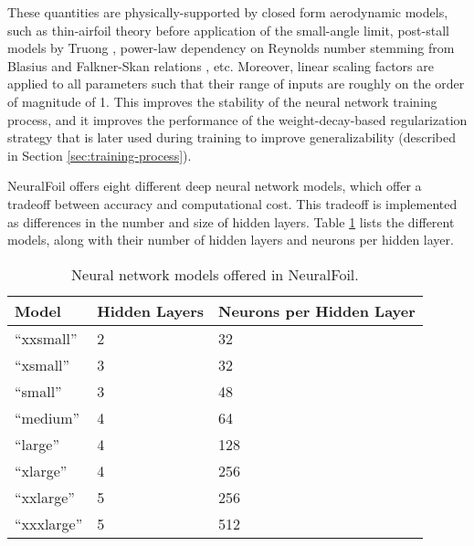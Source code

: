 \documentclass[conf]{new-aiaa}
\begin{document}
    \noindent These quantities are physically-supported by closed form aerodynamic models, such as thin-airfoil theory before application of the small-angle limit, post-stall models by Truong \cite{truong_analytical_2020}, power-law dependency on Reynolds number stemming from Blasius and Falkner-Skan relations \cite{drela_aerodynamics_2019}, etc. Moreover, linear scaling factors are applied to all parameters such that their range of inputs are roughly on the order of magnitude of 1. This improves the stability of the neural network training process, and it improves the performance of the weight-decay-based regularization strategy that is later used during training to improve generalizability (described in Section \ref{sec:training-process}).

    NeuralFoil offers eight different deep neural network models, which offer a tradeoff between accuracy and computational cost. This tradeoff is implemented as differences in the number and size of hidden layers. Table \ref{tab:model-sizes} lists the different models, along with their number of hidden layers and neurons per hidden layer.

    \begin{table}
        \centering
        \caption{Neural network models offered in NeuralFoil.}
        \label{tab:model-sizes}
        \begin{tabular}{lll}
            \toprule
            Model        & Hidden Layers & Neurons per Hidden Layer \\ \midrule
            ``xxsmall''  & 2             & 32                       \\
            ``xsmall''   & 3             & 32                       \\
            ``small''    & 3             & 48                       \\
            ``medium''   & 4             & 64                       \\
            ``large''    & 4             & 128                      \\
            ``xlarge''   & 4             & 256                      \\
            ``xxlarge''  & 5             & 256                      \\
            ``xxxlarge'' & 5             & 512                      \\
            \bottomrule
        \end{tabular}
    \end{table}
\end{document}
